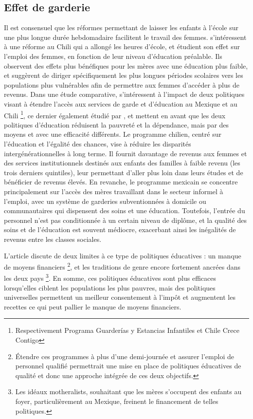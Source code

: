\documentclass[pagesize, twoside=off, bibliography=totoc, DIV=calc, fontsize=12pt, a4paper, french]{scrartcl}
\begin{document}
\subsection{Effet de garderie}

Il est consensuel que les réformes permettant de laisser les enfants à l’école sur une plus longue durée hebdomadaire facilitent le travail des femmes.  s’intéressent à une réforme au Chili qui a allongé les heures d’école, et étudient son effet sur l’emploi des femmes, en fonction de leur niveau d’éducation préalable. Ils observent des effets plus bénéfiques pour les mères avec une éducation plus faible, et suggèrent de diriger spécifiquement les plus longues périodes scolaires vers les populations plus vulnérables afin de permettre aux femmes d’accéder à plus de revenus. Dans une étude comparative, \citet{staab_2011} s’intéressent à l’impact de deux politiques visant à étendre l’accès aux services de garde et d’éducation au Mexique et au Chili \footnote{Respectivement  Programa Guarderías y Estancias Infantiles et Chile Crece Contigo}, ce dernier également étudié par \citet{berthelon}, et mettent en avant que les deux politiques d’éducation réduisent la pauvreté et la dépendance, mais par des moyens et avec une efficacité différents. Le programme chilien, centré sur l’éducation et l’égalité des chances, vise à réduire les disparités intergénérationnelles à long terme. Il fournit davantage de revenus aux femmes et des services institutionnels destinés aux enfants des familles à faible revenu (les trois derniers quintiles), leur permettant d’aller plus loin dans leurs études et de bénéficier de revenus élevés. En revanche, le programme mexicain se concentre principalement sur l’accès des mères travaillant dans le secteur informel à l’emploi, avec un système de garderies subventionnées à domicile ou communautaires qui dispensent des soins et une éducation. Toutefois, l’entrée du personnel n’est pas conditionnée à un certain niveau de diplôme, et la qualité des soins et de l’éducation est souvent médiocre, exacerbant ainsi les inégalités de revenus entre les classes sociales.

L’article discute de deux limites à ce type de politiques éducatives : un manque de moyens financiers \footnote{Étendre ces programmes à plus d’une demi-journée et assurer l’emploi de personnel qualifié permettrait une mise en place de politiques éducatives de qualité et donc une approche intégrée de ces deux objectifs.}, et les traditions de genre encore fortement ancrées dans les deux pays \footnote{Les idéaux motheralists, souhaitant que les mères s’occupent des enfants au foyer, particulièrement au Mexique, freinent le financement de telles politiques.}. En somme, ces politiques éducatives sont plus efficaces lorsqu’elles ciblent les populations les plus pauvres, mais des politiques universelles permettent un meilleur consentement à l’impôt et augmentent les recettes ce qui peut pallier le manque de moyens financiers.
\end{document}
